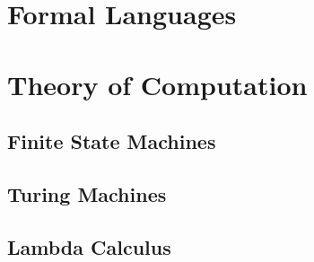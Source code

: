
\section{Formal Languages}




\section{Theory of Computation}

\subsection{Finite State Machines}

\subsection{Turing Machines}




\subsection{Lambda Calculus}

